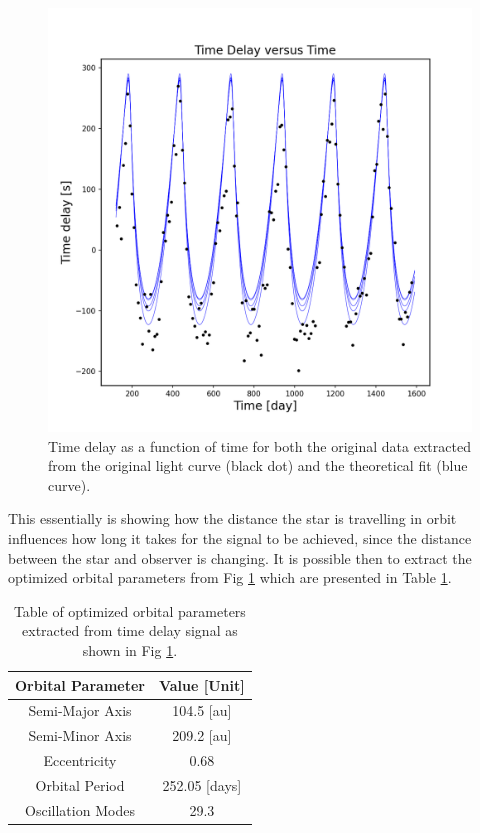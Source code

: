 \documentclass[]{article}
\begin{document}
\begin{figure}[H]
    \centering
    \includegraphics[width=1\linewidth]{time_delay.png}
    \caption{Time delay as a function of time for both the original data extracted from the original light curve (black dot) and the theoretical fit (blue curve).}
    \label{fig:timedelay}
\end{figure}
This essentially is showing how the distance the star is travelling in orbit influences how long it takes for the signal to be achieved, since the distance between the star and observer is changing. It is possible then to extract the optimized orbital parameters from Fig \ref{fig:timedelay} which are presented in Table \ref{tab: OptParam}.
\begin{table}[htp] 
\centering
\caption{Table of optimized orbital parameters extracted from time delay signal as shown in Fig \ref{fig:timedelay}.}
\setlength{\extrarowheight}{2pt}
\begin{tabular}{c | c}
Orbital Parameter & Value [Unit]\\
\hline
    Semi-Major Axis  & 104.5 [au]  \\
    Semi-Minor Axis & 209.2 [au] \\
    Eccentricity & 0.68 \\
    Orbital Period & 252.05 [days] \\
    Oscillation Modes & 29.3 \\
\end{tabular} 
\label{tab: OptParam}
\end{table}
\end{document}
